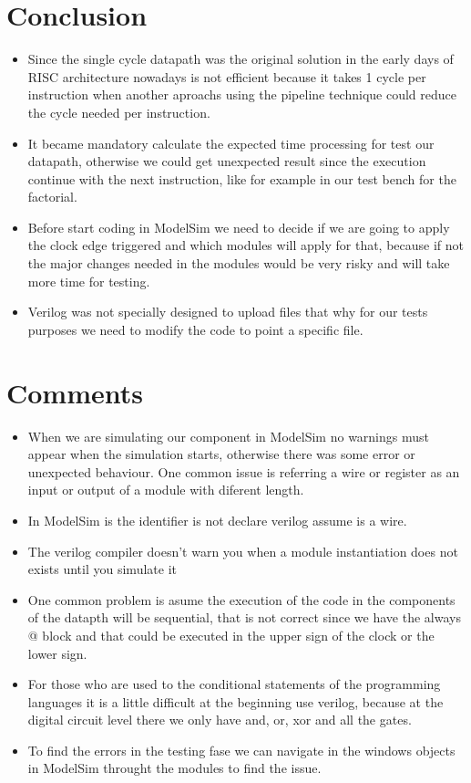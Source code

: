 \documentclass[conference]{IEEEtran}
\begin{document}
\section{Conclusion}
\begin{itemize}
\item Since the single cycle datapath was the original solution in the early days of RISC architecture nowadays
is not efficient because it takes 1 cycle per instruction when another aproachs using the pipeline technique
could reduce the cycle needed per instruction. 
\item It became mandatory calculate the expected time processing for test our datapath, otherwise we could
get unexpected result since the execution continue with the next instruction, like for example in our test bench
for the factorial.
\item Before start coding in ModelSim we need to decide if we are going to apply the clock edge 
triggered and which modules will apply for that, because if not the major changes needed 
in the modules would be very risky and will take more time for testing.
\item Verilog was not specially designed to upload files that why for our tests purposes we need to
modify the code to point a specific file. 
\end{itemize}
\section{Comments}
\begin{itemize}
\item When we are simulating our component in ModelSim no warnings must appear when the 
simulation starts, otherwise there was some error or unexpected behaviour. One common 
issue is referring a wire or register as an input or output of a module with diferent length.
\item In ModelSim is the identifier is not declare verilog assume is a wire.
\item The verilog compiler doesn't warn you when a module  instantiation does not exists until you simulate it
\item One common problem is asume the execution of the code in the components of the datapth will be sequential, 
that is not correct since we have the always @ block and that could be executed in the upper sign of the clock 
or the lower sign.
\item For those who are used to the conditional statements of the programming languages it is a little difficult at the 
beginning use verilog, because at the digital circuit level there we only have and, or, xor and all the gates.
\item To find the errors in the testing fase we can navigate in the windows objects in ModelSim throught the modules
to find the issue.
\end{itemize}
\end{document}
